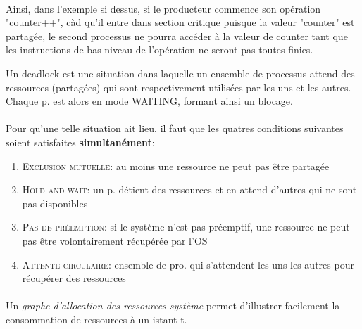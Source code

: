 {\paragraph{}Ainsi, dans l'exemple si dessus, si le producteur commence son opération "counter++", càd qu'il entre dans section critique puisque la valeur "counter" est partagée, le second processus ne pourra accéder à la valeur de counter tant que les instructions de bas niveau de l'opération ne seront pas toutes finies.
}


\item{}
{
Un deadlock est une situation dans laquelle un ensemble de processus attend des ressources (partagées) qui sont respectivement utilisées par les uns et les autres. Chaque p. est alors en mode WAITING, formant ainsi un blocage.
\paragraph{}

Pour qu'une telle situation ait lieu, il faut que les quatres conditions suivantes soient satisfaites \textbf{simultanément}:
\begin{enumerate}\setlength{\itemsep}{.3em}
\item \textsc{Exclusion mutuelle}: au moins une ressource ne peut pas être partagée
\item \textsc{Hold and wait}: un p. détient des ressources et en attend d'autres qui ne sont pas disponibles
\item \textsc{Pas de préemption}: si le système n'est pas préemptif, une ressource ne peut pas être volontairement récupérée par l'OS
\item \textsc{Attente circulaire}: ensemble de pro. qui s'attendent les uns les autres pour récupérer des ressources
\end{enumerate}

\paragraph{}
Un \textit{graphe d'allocation des ressources système} permet d'illustrer facilement la consommation de ressources à un istant t.

}
